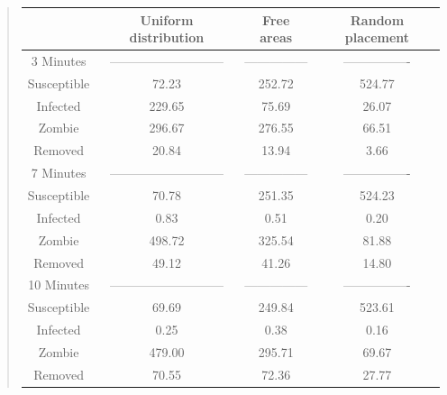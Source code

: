 \documentclass[%
twoside,                 %
final,                   %
10pt]{article}
\begin{document}
\begin{quote}
\begin{tabular}{cccc}
\hline
\multicolumn{1}{c}{  } & \multicolumn{1}{c}{ Uniform distribution } & \multicolumn{1}{c}{ Free areas } & \multicolumn{1}{c}{ Random placement } \\
\hline
3 Minutes   & --------------------------- & --------------- & ---------------- \\
\hline
Susceptible & 72.23                       & 252.72          & 524.77           \\
Infected    & 229.65                      & 75.69           & 26.07            \\
Zombie      & 296.67                      & 276.55          & 66.51            \\
Removed     & 20.84                       & 13.94           & 3.66             \\
\hline
7 Minutes   & --------------------------- & --------------- & ---------------- \\
\hline
Susceptible & 70.78                       & 251.35          & 524.23           \\
Infected    & 0.83                        & 0.51            & 0.20             \\
Zombie      & 498.72                      & 325.54          & 81.88            \\
Removed     & 49.12                       & 41.26           & 14.80            \\
\hline
10 Minutes  & --------------------------- & --------------- & ---------------- \\
\hline
Susceptible & 69.69                       & 249.84          & 523.61           \\
Infected    & 0.25                        & 0.38            & 0.16             \\
Zombie      & 479.00                      & 295.71          & 69.67            \\
Removed     & 70.55                       & 72.36           & 27.77            \\
\hline
\end{tabular}
\end{quote}

\noindent
\end{document}
